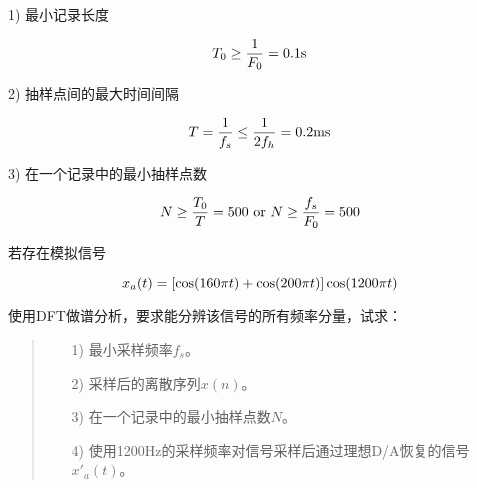 \documentclass[cn, hazy, blue, normal, 14pt]{elegantnote}
\begin{document}
\begin{solution}[print=true]
    
1) 最小记录长度

\begin{equation}
    \notag
    T_0\geq\frac{1}{F_0}=0.1\text{s}
\end{equation}

2) 抽样点间的最大时间间隔

\begin{equation}
    \notag
    T=\frac{1}{f_s}\leq\frac{1}{2f_h}=0.2\text{ms}
\end{equation}

3) 在一个记录中的最小抽样点数

\begin{equation}
    \notag
    N\geq\frac{T_0}{T}=500 \text{ or } N\geq\frac{f_s}{F_0}=500
\end{equation}

\end{solution}

\begin{exercise}

若存在模拟信号

\begin{equation}
\notag
    x_a(t)=[\cos(160\pi t)+\cos(200\pi t)]\cos(1200\pi t)
\end{equation}

使用DFT做谱分析，要求能分辨该信号的所有频率分量，试求：

\begin{quote}
\begin{itemize}
    \item[1)] 最小采样频率$f_s$。
    \item[2)] 采样后的离散序列$x(n)$。
    \item[3)] 在一个记录中的最小抽样点数$N$。
    \item[4)] 使用1200Hz的采样频率对信号采样后通过理想D/A恢复的信号$x'_a(t)$。
\end{itemize}
\end{quote}

\end{exercise}
\end{document}
